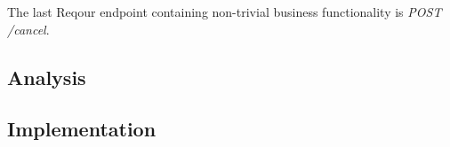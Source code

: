 \documentclass[../main.tex]{subfiles}
\begin{document}
The last Reqour endpoint containing non-trivial business functionality is \textit{POST /cancel}.

\subsection{Analysis}


\subsection{Implementation}

\end{document}
